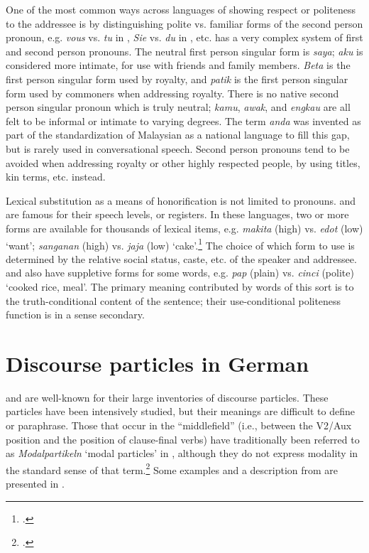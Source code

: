 One of the most common ways across languages of showing respect or politeness to the addressee is by distinguishing polite vs. familiar forms of the second person pronoun, e.g. \textit{vous} vs. \textit{tu} in , \textit{Sie} vs. \textit{du} in , etc.  has a very complex system of first and second person pronouns. The neutral first person singular form is \textit{saya}; \textit{aku} is considered more intimate, for use with friends and family members. \textit{Beta} is the first person singular form used by royalty, and \textit{patik} is the first person singular form used by commoners when addressing royalty. There is no native  second person singular pronoun which is truly neutral; \textit{kamu}, \textit{awak}, and \textit{engkau} are all felt to be informal or intimate to varying degrees. The term \textit{anda} was invented as part of the standardization of Malaysian as a national language to fill this gap, but is rarely used in conversational speech. Second person pronouns tend to be avoided when addressing royalty or other highly respected people, by using titles, kin terms, etc. instead.



Lexical substitution as a means of honorification is not limited to pronouns.  and  are famous for their speech levels, or registers. In these languages, two or more forms are available for thousands of lexical items, e.g.  \textit{makita} (high) vs. \textit{edot} (low) ‘want’; \textit{sanganan} (high) vs. \textit{jaja} (low) ‘cake’.\footnote{\citet{Arka2005}.} The choice of which form to use is determined by the relative social status, caste, etc. of the speaker and addressee.  and  also have suppletive forms for some words, e.g.  \textit{pap} (plain) vs. \textit{cinci} (polite) ‘cooked rice, meal’. The primary meaning contributed by words of this sort is to the truth-conditional content of the sentence; their use-conditional politeness function is in a sense secondary.


\section{Discourse particles in German}\label{sec:11.6}

 and  are well-known for their large inventories of discourse particles. These particles have been intensively studied, but their meanings are difficult to define or paraphrase. Those that occur in the “middlefield” (i.e., between the V2/Aux position and the position of clause-final verbs) have traditionally been referred to as \textit{Modalpartikeln} ‘modal particles’ in , although they do not express modality in the standard sense of that term.\footnote{\citet[45--46]{Palmer1986}.} Some examples and a description from \citet[2013]{Zimmermann2011} are presented in .


